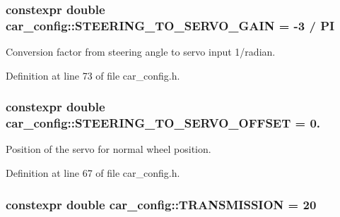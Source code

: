 \subsubsection[{\texorpdfstring{S\+T\+E\+E\+R\+I\+N\+G\+\_\+\+T\+O\+\_\+\+S\+E\+R\+V\+O\+\_\+\+G\+A\+IN}{STEERING_TO_SERVO_GAIN}}]{\setlength{\rightskip}{0pt plus 5cm}constexpr double car\+\_\+config\+::\+S\+T\+E\+E\+R\+I\+N\+G\+\_\+\+T\+O\+\_\+\+S\+E\+R\+V\+O\+\_\+\+G\+A\+IN = -\/3 / {\bf PI}}\hypertarget{namespacecar__config_aa8ab85fe7b8ab728f34d15028f114d86}{}\label{namespacecar__config_aa8ab85fe7b8ab728f34d15028f114d86}


Conversion factor from steering angle to servo input  1/radian. 



Definition at line 73 of file car\+\_\+config.\+h.

\subsubsection[{\texorpdfstring{S\+T\+E\+E\+R\+I\+N\+G\+\_\+\+T\+O\+\_\+\+S\+E\+R\+V\+O\+\_\+\+O\+F\+F\+S\+ET}{STEERING_TO_SERVO_OFFSET}}]{\setlength{\rightskip}{0pt plus 5cm}constexpr double car\+\_\+config\+::\+S\+T\+E\+E\+R\+I\+N\+G\+\_\+\+T\+O\+\_\+\+S\+E\+R\+V\+O\+\_\+\+O\+F\+F\+S\+ET = 0.}\hypertarget{namespacecar__config_abb6ef746663276219b321683dfbb8896}{}\label{namespacecar__config_abb6ef746663276219b321683dfbb8896}


Position of the servo for normal wheel position. 



Definition at line 67 of file car\+\_\+config.\+h.

\subsubsection[{\texorpdfstring{T\+R\+A\+N\+S\+M\+I\+S\+S\+I\+ON}{TRANSMISSION}}]{\setlength{\rightskip}{0pt plus 5cm}constexpr double car\+\_\+config\+::\+T\+R\+A\+N\+S\+M\+I\+S\+S\+I\+ON = 20}\hypertarget{namespacecar__config_a7af97a6c9168673aba8917029cfe44d3}{}\label{namespacecar__config_a7af97a6c9168673aba8917029cfe44d3}


